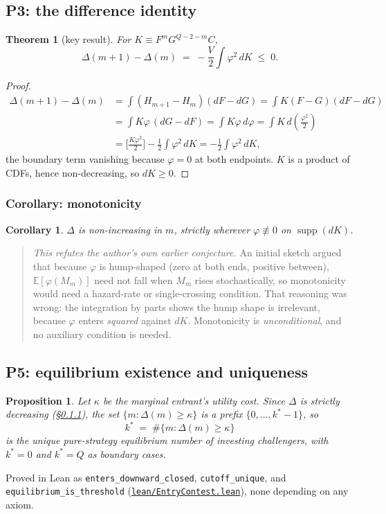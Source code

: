 \documentclass[11pt]{article}
\newtheorem{proposition}{Proposition}
\newtheorem{theorem}{Theorem}
\newtheorem{corollary}{Corollary}
\newcommand{\file}[1]{\href{run:#1}{\texttt{#1}}}
\begin{document}
\subsection{P3: the difference identity}
\label{prop:P3}
\begin{theorem}[key result]
For $K\equiv F^m G^{Q-2-m}C$,
\[
  \Delta(m{+}1)-\Delta(m) \;=\; -\frac{V}{2}\int\varphi^2\,dK \;\le\;0.
\]
\end{theorem}
\begin{proof}
\begin{align*}
\Delta(m{+}1)-\Delta(m)
  &= \int (H_{m+1}-H_m)(dF-dG) = \int K(F-G)(dF-dG) \\
  &= \int K\varphi\,(dG-dF) = \int K\varphi\,d\varphi
   = \int K\,d\!\left(\tfrac{\varphi^2}{2}\right) \\
  &= \Big[\tfrac{K\varphi^2}{2}\Big] - \tfrac12\int\varphi^2\,dK
   = -\tfrac12\int\varphi^2\,dK,
\end{align*}
the boundary term vanishing because $\varphi=0$ at both endpoints. $K$
is a product of CDFs, hence non-decreasing, so $dK\ge0$.
\end{proof}

\subsubsection{Corollary: monotonicity}
\label{cor:monotone}
\begin{corollary}
$\Delta$ is non-increasing in $m$, strictly wherever
$\varphi\not\equiv0$ on $\operatorname{supp}(dK)$.
\end{corollary}

\begin{quotation}
\noindent\textit{This refutes the author's own earlier conjecture.} An
initial sketch argued that because $\varphi$ is hump-shaped (zero at
both ends, positive between), $\mathbb E[\varphi(M_m)]$ need not fall
when $M_m$ rises stochastically, so monotonicity would need a
hazard-rate or single-crossing condition. That reasoning was wrong:
the integration by parts shows the hump shape is irrelevant, because
$\varphi$ enters \emph{squared} against $dK$. Monotonicity is
\emph{unconditional}, and no auxiliary condition is needed.
\end{quotation}

\subsection{P5: equilibrium existence and uniqueness}
\label{prop:P5}
\begin{proposition}
Let $\kappa$ be the marginal entrant's utility cost. Since $\Delta$ is
strictly decreasing (\S\ref{cor:monotone}), the set
$\{m:\Delta(m)\ge\kappa\}$ is a prefix $\{0,\dots,k^*-1\}$, so
\[
  k^* \;=\; \#\{m:\Delta(m)\ge\kappa\}
\]
is the unique pure-strategy equilibrium number of investing
challengers, with $k^*=0$ and $k^*=Q$ as boundary cases.
\end{proposition}
Proved in Lean as \texttt{enters\_downward\_closed},
\texttt{cutoff\_unique}, and \texttt{equilibrium\_is\_threshold}
(\file{lean/EntryContest.lean}), none depending on any axiom.
\end{document}
